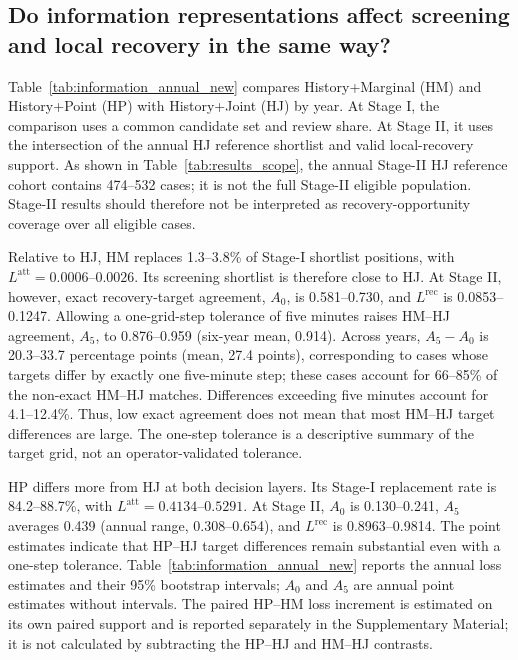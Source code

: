 \subsection{Do information representations affect screening and local recovery in the same way?}
\label{subsec:results_information}

Table~\ref{tab:information_annual_new} compares History+Marginal (HM) and History+Point (HP) with History+Joint (HJ) by year. At Stage I, the comparison uses a common candidate set and review share. At Stage II, it uses the intersection of the annual HJ reference shortlist and valid local-recovery support. As shown in Table~\ref{tab:results_scope}, the annual Stage-II HJ reference cohort contains 474--532 cases; it is not the full Stage-II eligible population. Stage-II results should therefore not be interpreted as recovery-opportunity coverage over all eligible cases.

Relative to HJ, HM replaces 1.3--3.8\% of Stage-I shortlist positions, with $L^{\mathrm{att}}=0.0006$--$0.0026$. Its screening shortlist is therefore close to HJ. At Stage II, however, exact recovery-target agreement, $A_0$, is 0.581--0.730, and $L^{\mathrm{rec}}$ is 0.0853--0.1247. Allowing a one-grid-step tolerance of five minutes raises HM--HJ agreement, $A_5$, to 0.876--0.959 (six-year mean, 0.914). Across years, $A_5-A_0$ is 20.3--33.7 percentage points (mean, 27.4 points), corresponding to cases whose targets differ by exactly one five-minute step; these cases account for 66--85\% of the non-exact HM--HJ matches. Differences exceeding five minutes account for 4.1--12.4\%. Thus, low exact agreement does not mean that most HM--HJ target differences are large. The one-step tolerance is a descriptive summary of the target grid, not an operator-validated tolerance.

HP differs more from HJ at both decision layers. Its Stage-I replacement rate is 84.2--88.7\%, with $L^{\mathrm{att}}=0.4134$--$0.5291$. At Stage II, $A_0$ is 0.130--0.241, $A_5$ averages 0.439 (annual range, 0.308--0.654), and $L^{\mathrm{rec}}$ is 0.8963--0.9814. The point estimates indicate that HP--HJ target differences remain substantial even with a one-step tolerance. Table~\ref{tab:information_annual_new} reports the annual loss estimates and their 95\% bootstrap intervals; $A_0$ and $A_5$ are annual point estimates without intervals. The paired HP--HM loss increment is estimated on its own paired support and is reported separately in the Supplementary Material; it is not calculated by subtracting the HP--HJ and HM--HJ contrasts.

